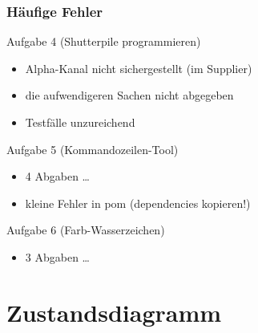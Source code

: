 \documentclass[18pt]{beamer}
\begin{document}
\begin{frame}
		\frametitle{Häufige Fehler}
		\begin{block}{Aufgabe 4 (Shutterpile programmieren)}
			\begin{itemize}
				\item Alpha-Kanal nicht sichergestellt (im Supplier)
				\pause
				\item die aufwendigeren Sachen nicht abgegeben
				\pause
				\item Testfälle unzureichend
			\end{itemize}
		\end{block}
	
	\begin{block}{Aufgabe 5 (Kommandozeilen-Tool)}
		\begin{itemize}
			\item 4 Abgaben \dots
			\item kleine Fehler in pom (dependencies kopieren!)
		\end{itemize}
	\end{block}

	\begin{block}{Aufgabe 6 (Farb-Wasserzeichen)}
		\begin{itemize}
			\item 3 Abgaben \dots
		\end{itemize}
	\end{block}
\end{frame}

\section{Zustandsdiagramm}
\end{document}
